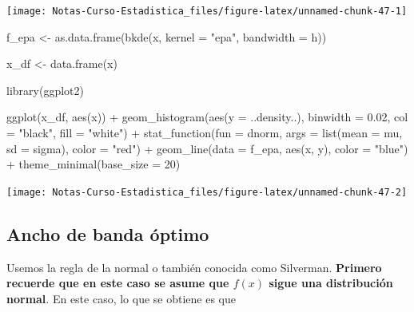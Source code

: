\documentclass[
  12pt,
]{book}
\newenvironment{Shaded}{\begin{snugshade}}{\end{snugshade}}
\newcommand{\AttributeTok}[1]{\textcolor[rgb]{0.77,0.63,0.00}{#1}}
\newcommand{\DecValTok}[1]{\textcolor[rgb]{0.00,0.00,0.81}{#1}}
\newcommand{\FloatTok}[1]{\textcolor[rgb]{0.00,0.00,0.81}{#1}}
\newcommand{\FunctionTok}[1]{\textcolor[rgb]{0.00,0.00,0.00}{#1}}
\newcommand{\NormalTok}[1]{#1}
\newcommand{\OtherTok}[1]{\textcolor[rgb]{0.56,0.35,0.01}{#1}}
\newcommand{\SpecialCharTok}[1]{\textcolor[rgb]{0.00,0.00,0.00}{#1}}
\newcommand{\StringTok}[1]{\textcolor[rgb]{0.31,0.60,0.02}{#1}}
\theoremstyle{definition}
\theoremstyle{definition}
\theoremstyle{definition}
\theoremstyle{remark}
\begin{document}
\begin{center}\texttt{[image: Notas-Curso-Estadistica\_files/figure-latex/unnamed-chunk-47-1]} \end{center}

\begin{Shaded}
\begin{Highlighting}[]
\NormalTok{f\_epa }\OtherTok{\textless{}{-}} \FunctionTok{as.data.frame}\NormalTok{(}\FunctionTok{bkde}\NormalTok{(x, }\AttributeTok{kernel =} \StringTok{"epa"}\NormalTok{, }\AttributeTok{bandwidth =}\NormalTok{ h))}

\NormalTok{x\_df }\OtherTok{\textless{}{-}} \FunctionTok{data.frame}\NormalTok{(x)}

\FunctionTok{library}\NormalTok{(ggplot2)}

\FunctionTok{ggplot}\NormalTok{(x\_df, }\FunctionTok{aes}\NormalTok{(x)) }\SpecialCharTok{+} \FunctionTok{geom\_histogram}\NormalTok{(}\FunctionTok{aes}\NormalTok{(}\AttributeTok{y =}\NormalTok{ ..density..), }
    \AttributeTok{binwidth =} \FloatTok{0.02}\NormalTok{, }\AttributeTok{col =} \StringTok{"black"}\NormalTok{, }\AttributeTok{fill =} \StringTok{"white"}\NormalTok{) }\SpecialCharTok{+} 
    \FunctionTok{stat\_function}\NormalTok{(}\AttributeTok{fun =}\NormalTok{ dnorm, }\AttributeTok{args =} \FunctionTok{list}\NormalTok{(}\AttributeTok{mean =}\NormalTok{ mu, }
        \AttributeTok{sd =}\NormalTok{ sigma), }\AttributeTok{color =} \StringTok{"red"}\NormalTok{) }\SpecialCharTok{+} \FunctionTok{geom\_line}\NormalTok{(}\AttributeTok{data =}\NormalTok{ f\_epa, }
    \FunctionTok{aes}\NormalTok{(x, y), }\AttributeTok{color =} \StringTok{"blue"}\NormalTok{) }\SpecialCharTok{+} \FunctionTok{theme\_minimal}\NormalTok{(}\AttributeTok{base\_size =} \DecValTok{20}\NormalTok{)}
\end{Highlighting}
\end{Shaded}

\begin{center}\texttt{[image: Notas-Curso-Estadistica\_files/figure-latex/unnamed-chunk-47-2]} \end{center}

\hypertarget{ancho-de-banda-uxf3ptimo-1}{%
\subsection{Ancho de banda óptimo}\label{ancho-de-banda-uxf3ptimo-1}}

Usemos la regla de la normal o también conocida como Silverman.
\textbf{Primero recuerde que en este caso se asume que \(f(x)\) sigue una distribución normal}. En este caso, lo que se obtiene es que
\end{document}
